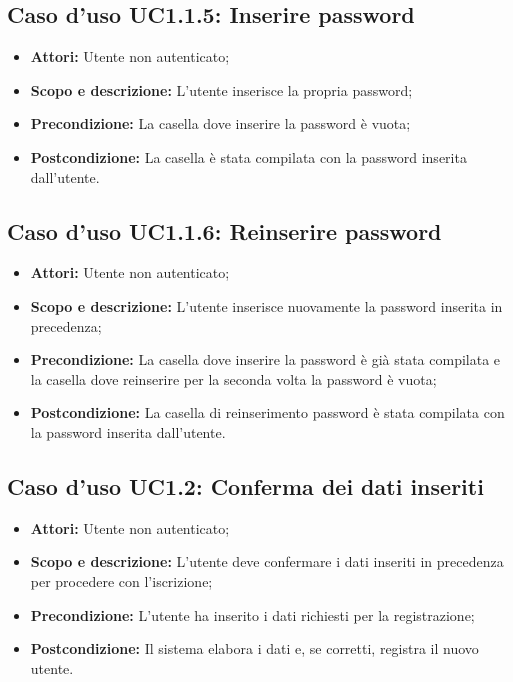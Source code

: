 \subsection{Caso d'uso UC1.1.5: Inserire password}
\begin{itemize}
	\item \textbf{Attori:} Utente non autenticato;
	\item \textbf{Scopo e descrizione:} L'utente inserisce la propria password;
	\item \textbf{Precondizione:} La casella dove inserire la password è vuota;
	\item \textbf{Postcondizione:} La casella è stata compilata con la password inserita dall'utente.
\end{itemize}

\subsection{Caso d'uso UC1.1.6: Reinserire password}
\begin{itemize}
	\item \textbf{Attori:} Utente non autenticato;
	\item \textbf{Scopo e descrizione:} L'utente inserisce nuovamente la password inserita in precedenza;
	\item \textbf{Precondizione:} La casella dove inserire la password è già stata compilata e la casella dove reinserire per la seconda volta la password è vuota;
	\item \textbf{Postcondizione:} La casella di reinserimento password è stata compilata con la password inserita dall'utente.
\end{itemize}

\subsection{Caso d'uso UC1.2: Conferma dei dati inseriti}
\begin{itemize}
	\item \textbf{Attori:} Utente non autenticato;
	\item \textbf{Scopo e descrizione:} L'utente deve confermare i dati inseriti in precedenza per procedere con l'iscrizione;
	\item \textbf{Precondizione:} L'utente ha inserito i dati richiesti per la registrazione;
	\item \textbf{Postcondizione:} Il sistema elabora i dati e, se corretti, registra il nuovo utente.
\end{itemize}
